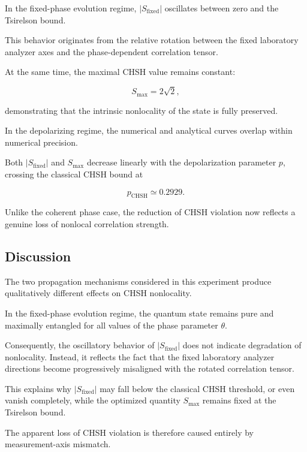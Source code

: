 In the fixed-phase evolution regime, \( |S_{\mathrm{fixed}}| \) oscillates between zero and the Tsirelson bound.

This behavior originates from the relative rotation between the fixed laboratory analyzer axes and the phase-dependent correlation tensor.

At the same time, the maximal CHSH value remains constant:

\[
S_{\max}
=
2\sqrt{2},
\]

demonstrating that the intrinsic nonlocality of the state is fully preserved.

\medskip

In the depolarizing regime, the numerical and analytical curves overlap within numerical precision.

Both \( |S_{\mathrm{fixed}}| \) and \( S_{\max} \) decrease linearly with the depolarization parameter \(p\), crossing the classical CHSH bound at

\[
p_{\mathrm{CHSH}}
\simeq
0.2929.
\]

Unlike the coherent phase case, the reduction of CHSH violation now reflects a genuine loss of nonlocal correlation strength.


\subsection*{Discussion}

The two propagation mechanisms considered in this experiment produce qualitatively different effects on CHSH nonlocality.

In the fixed-phase evolution regime, the quantum state remains pure and maximally entangled for all values of the phase parameter \( \theta \).

Consequently, the oscillatory behavior of \( |S_{\mathrm{fixed}}| \) does not indicate degradation of nonlocality. Instead, it reflects the fact that the fixed laboratory analyzer directions become progressively misaligned with the rotated correlation tensor.

This explains why \( |S_{\mathrm{fixed}}| \) may fall below the classical CHSH threshold, or even vanish completely, while the optimized quantity \( S_{\max} \) remains fixed at the Tsirelson bound.

The apparent loss of CHSH violation is therefore caused entirely by measurement-axis mismatch.

